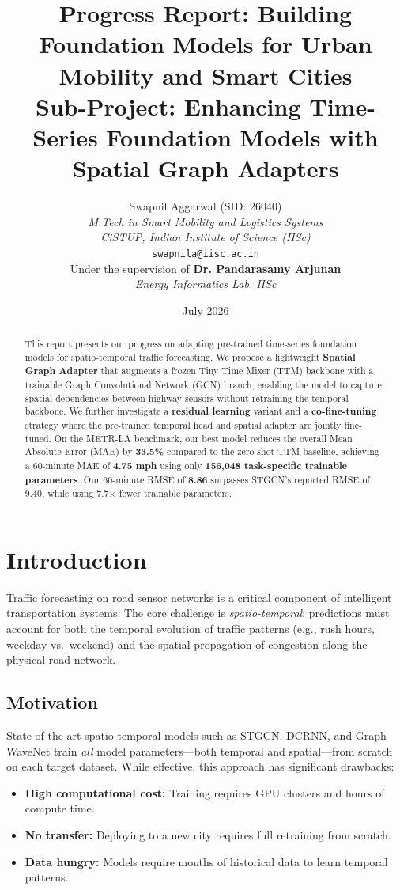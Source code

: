 \documentclass[11pt, a4paper]{article}
\title{
    \textbf{Progress Report: Building Foundation Models for Urban Mobility and Smart Cities} \\
    \large{Sub-Project: Enhancing Time-Series Foundation Models with Spatial Graph Adapters}
}
\author{
    Swapnil Aggarwal (SID: 26040) \\
    \textit{M.Tech in Smart Mobility and Logistics Systems} \\
    \textit{CiSTUP, Indian Institute of Science (IISc)} \\
    \texttt{swapnila@iisc.ac.in} \\
    \vspace{0.3cm}
    Under the supervision of \textbf{Dr. Pandarasamy Arjunan} \\
    \textit{Energy Informatics Lab, IISc}
}
\date{July 2026}
\begin{document}
\maketitle

\begin{abstract}
This report presents our progress on adapting pre-trained time-series foundation models for spatio-temporal traffic forecasting. We propose a lightweight \textbf{Spatial Graph Adapter} that augments a frozen Tiny Time Mixer (TTM) backbone with a trainable Graph Convolutional Network (GCN) branch, enabling the model to capture spatial dependencies between highway sensors without retraining the temporal backbone. We further investigate a \textbf{residual learning} variant and a \textbf{co-fine-tuning} strategy where the pre-trained temporal head and spatial adapter are jointly fine-tuned. On the METR-LA benchmark, our best model reduces the overall Mean Absolute Error (MAE) by \textbf{33.5\%} compared to the zero-shot TTM baseline, achieving a 60-minute MAE of \textbf{4.75 mph} using only \textbf{156,048 task-specific trainable parameters}. Our 60-minute RMSE of \textbf{8.86} surpasses STGCN's reported RMSE of 9.40, while using 7.7$\times$ fewer trainable parameters.
\end{abstract}

\section{Introduction}
\label{sec:intro}

Traffic forecasting on road sensor networks is a critical component of intelligent transportation systems. The core challenge is \textit{spatio-temporal}: predictions must account for both the temporal evolution of traffic patterns (e.g., rush hours, weekday vs.\ weekend) and the spatial propagation of congestion along the physical road network.

\subsection{Motivation}
State-of-the-art spatio-temporal models such as STGCN, DCRNN, and Graph WaveNet train \textit{all} model parameters---both temporal and spatial---from scratch on each target dataset. While effective, this approach has significant drawbacks:
\begin{itemize}[nosep]
    \item \textbf{High computational cost:} Training requires GPU clusters and hours of compute time.
    \item \textbf{No transfer:} Deploying to a new city requires full retraining from scratch.
    \item \textbf{Data hungry:} Models require months of historical data to learn temporal patterns.
\end{itemize}
\end{document}
